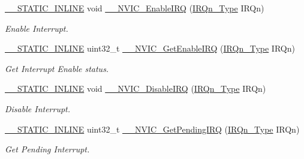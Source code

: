 \begin{DoxyCompactItemize}
\item 
\hyperlink{cmsis__iccarm_8h_aba87361bfad2ae52cfe2f40c1a1dbf9c}{\+\_\+\+\_\+\+S\+T\+A\+T\+I\+C\+\_\+\+I\+N\+L\+I\+NE} void \hyperlink{group___c_m_s_i_s___core___n_v_i_c_functions_ga71227e1376cde11eda03fcb62f1b33ea}{\+\_\+\+\_\+\+N\+V\+I\+C\+\_\+\+Enable\+I\+RQ} (\hyperlink{group___c_m_s_i_s__18_x_x___i_r_q_gaa44deabd252bda567898bae35a086adc}{I\+R\+Qn\+\_\+\+Type} I\+R\+Qn)
\begin{DoxyCompactList}\small\item\em Enable Interrupt. \end{DoxyCompactList}\item 
\hyperlink{cmsis__iccarm_8h_aba87361bfad2ae52cfe2f40c1a1dbf9c}{\+\_\+\+\_\+\+S\+T\+A\+T\+I\+C\+\_\+\+I\+N\+L\+I\+NE} uint32\+\_\+t \hyperlink{group___c_m_s_i_s___core___n_v_i_c_functions_gaaeb5e7cc0eaad4e2817272e7bf742083}{\+\_\+\+\_\+\+N\+V\+I\+C\+\_\+\+Get\+Enable\+I\+RQ} (\hyperlink{group___c_m_s_i_s__18_x_x___i_r_q_gaa44deabd252bda567898bae35a086adc}{I\+R\+Qn\+\_\+\+Type} I\+R\+Qn)
\begin{DoxyCompactList}\small\item\em Get Interrupt Enable status. \end{DoxyCompactList}\item 
\hyperlink{cmsis__iccarm_8h_aba87361bfad2ae52cfe2f40c1a1dbf9c}{\+\_\+\+\_\+\+S\+T\+A\+T\+I\+C\+\_\+\+I\+N\+L\+I\+NE} void \hyperlink{group___c_m_s_i_s___core___n_v_i_c_functions_gae016e4c1986312044ee768806537d52f}{\+\_\+\+\_\+\+N\+V\+I\+C\+\_\+\+Disable\+I\+RQ} (\hyperlink{group___c_m_s_i_s__18_x_x___i_r_q_gaa44deabd252bda567898bae35a086adc}{I\+R\+Qn\+\_\+\+Type} I\+R\+Qn)
\begin{DoxyCompactList}\small\item\em Disable Interrupt. \end{DoxyCompactList}\item 
\hyperlink{cmsis__iccarm_8h_aba87361bfad2ae52cfe2f40c1a1dbf9c}{\+\_\+\+\_\+\+S\+T\+A\+T\+I\+C\+\_\+\+I\+N\+L\+I\+NE} uint32\+\_\+t \hyperlink{group___c_m_s_i_s___core___n_v_i_c_functions_ga5a92ca5fa801ad7adb92be7257ab9694}{\+\_\+\+\_\+\+N\+V\+I\+C\+\_\+\+Get\+Pending\+I\+RQ} (\hyperlink{group___c_m_s_i_s__18_x_x___i_r_q_gaa44deabd252bda567898bae35a086adc}{I\+R\+Qn\+\_\+\+Type} I\+R\+Qn)
\begin{DoxyCompactList}\small\item\em Get Pending Interrupt. \end{DoxyCompactList}\item 

\end{DoxyCompactItemize}
